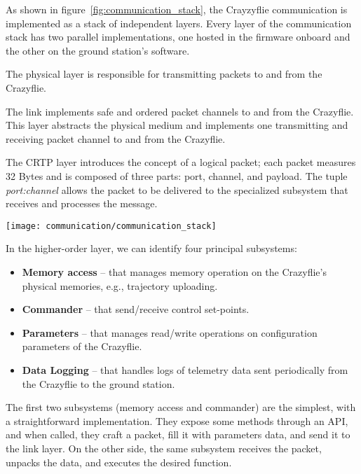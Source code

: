 As shown in figure~\ref{fig:communication_stack}, the Crayzyflie communication is implemented as a stack of independent layers.
Every layer of the communication stack has two parallel implementations, one hosted in the firmware onboard and the other on the ground station's software.

The physical layer is responsible for transmitting packets to and from the Crazyflie. 

The link implements safe and ordered packet channels to and from the Crazyflie. This layer abstracts the physical medium and implements one transmitting and receiving packet channel to and from the Crazyflie.

The CRTP layer introduces the concept of a logical packet; each packet measures 32 Bytes and is composed of three parts: port, channel, and payload.
The tuple \textit{port:channel} allows the packet to be delivered to the specialized subsystem that receives and processes the message.

\begin{SCfigure}[\sidecaptionrelwidth][tb]
    \texttt{[image: communication/communication\_stack]}
    \caption[The Crazyflie communication stack]{The Crayzyflie communication stack is composed of 4 independent layers: Subsystems, CRTP, Link, Physical medium}
    \label{fig:communication_stack}
\end{SCfigure}

In the higher-order layer, we can identify four principal subsystems:
\begin{itemize}
    \item \textbf{Memory access} -- that manages memory operation on the Crazyflie's physical memories, e.g., trajectory uploading.
    \item \textbf{Commander} -- that send/receive control set-points.
    \item \textbf{Parameters} -- that manages read/write operations on configuration parameters of the Crazyflie.
    \item \textbf{Data Logging} -- that handles logs of telemetry data sent periodically from the Crazyflie to the ground station. 
\end{itemize} 

The first two subsystems (memory access and commander) are the simplest, with a straightforward implementation. 
They expose some methods through an API, and when called, they craft a packet, fill it with parameters data, and send it to the link layer.
On the other side, the same subsystem receives the packet, unpacks the data, and executes the desired function.

